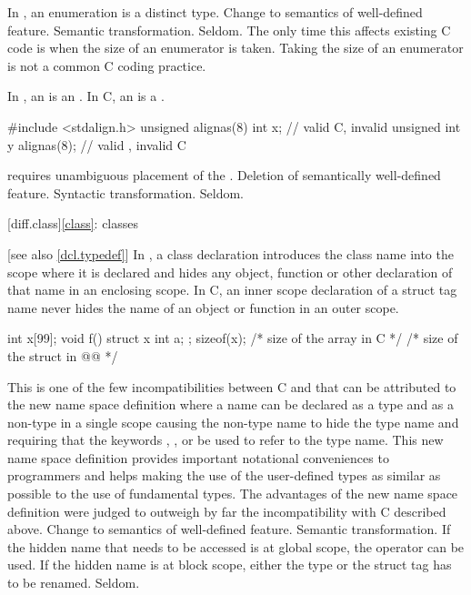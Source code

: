 \rationale
In \Cpp{}, an enumeration is a distinct type.
\effect
Change to semantics of well-defined feature.
\difficulty
Semantic transformation.
\howwide
Seldom.
The only time this affects existing C code is when the size of an
enumerator is taken.
Taking the size of an enumerator is not a
common C coding practice.

\change
In \Cpp{},
an  is an .
In C, an  is a .

\begin{example}
\begin{codeblock}
#include <stdalign.h>
unsigned alignas(8) int x;      // valid C, invalid \Cpp{}
unsigned int y alignas(8);      // valid \Cpp{}, invalid C
\end{codeblock}
\end{example}

\rationale
\Cpp{} requires unambiguous placement of the .
\effect
Deletion of semantically well-defined feature.
\difficulty
Syntactic transformation.
\howwide
Seldom.

[diff.class]{\ref{class}: classes}

 [see also \ref{dcl.typedef}]
\change
In \Cpp{}, a class declaration introduces the class name into the scope where it is
declared and hides any object, function or other declaration of that name in an enclosing
scope. In C, an inner scope declaration of a struct tag name never hides the name of an
object or function in an outer scope.

\begin{example}
\begin{codeblock}
int x[99];
void f() {
  struct x { int a; };
  sizeof(x);  /* size of the array in C */
  /* size of the struct in @\textit{\textrm{\Cpp{}}}@ */
}
\end{codeblock}
\end{example}
\rationale
This is one of the few incompatibilities between C and \Cpp{} that
can be attributed to the new \Cpp{} name space definition where a
name can be declared as a type and as a non-type in a single scope
causing the non-type name to hide the type name and requiring that
the keywords , ,  or  be used to refer to the type name.
This new name space definition provides important notational
conveniences to \Cpp{} programmers and helps making the use of the
user-defined types as similar as possible to the use of fundamental
types.
The advantages of the new name space definition were judged to
outweigh by far the incompatibility with C described above.
\effect
Change to semantics of well-defined feature.
\difficulty
Semantic transformation.
If the hidden name that needs to be accessed is at global scope,
the \tcode{::} \Cpp{} operator can be used.
If the hidden name is at block scope, either the type or the struct
tag has to be renamed.
\howwide
Seldom.

